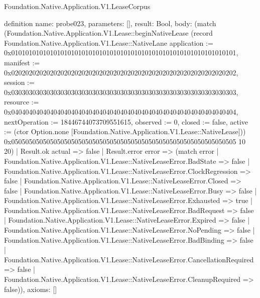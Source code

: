 \begin{lexlean}{Foundation.Native.Application.V1.LeaseCorpus}
\begin{semanticmodule}
definition{
  name: probe023,
  parameters: [],
  result: Bool,
  body: (match (Foundation.Native.Application.V1.Lease::beginNativeLease (record Foundation.Native.Application.V1.Lease::NativeLane {application := 0x0101010101010101010101010101010101010101010101010101010101010101, manifest := 0x0202020202020202020202020202020202020202020202020202020202020202, session := 0x0303030303030303030303030303030303030303030303030303030303030303, resource := 0x0404040404040404040404040404040404040404040404040404040404040404, nextOperation := 18446744073709551615, observed := 0, closed := false, active := (ctor Option.none [Foundation.Native.Application.V1.Lease::NativeLease])}) 0x0505050505050505050505050505050505050505050505050505050505050505 10 20)
    | Result.ok actual => false
    | Result.error error => (match error
      | Foundation.Native.Application.V1.Lease::NativeLeaseError.BadState => false
      | Foundation.Native.Application.V1.Lease::NativeLeaseError.ClockRegression => false
      | Foundation.Native.Application.V1.Lease::NativeLeaseError.Closed => false
      | Foundation.Native.Application.V1.Lease::NativeLeaseError.Busy => false
      | Foundation.Native.Application.V1.Lease::NativeLeaseError.Exhausted => true
      | Foundation.Native.Application.V1.Lease::NativeLeaseError.BadRequest => false
      | Foundation.Native.Application.V1.Lease::NativeLeaseError.Expired => false
      | Foundation.Native.Application.V1.Lease::NativeLeaseError.NoPending => false
      | Foundation.Native.Application.V1.Lease::NativeLeaseError.BadBinding => false
      | Foundation.Native.Application.V1.Lease::NativeLeaseError.CancellationRequired => false
      | Foundation.Native.Application.V1.Lease::NativeLeaseError.CleanupRequired => false)),
  axioms: []
}


\end{semanticmodule}
\end{lexlean}
